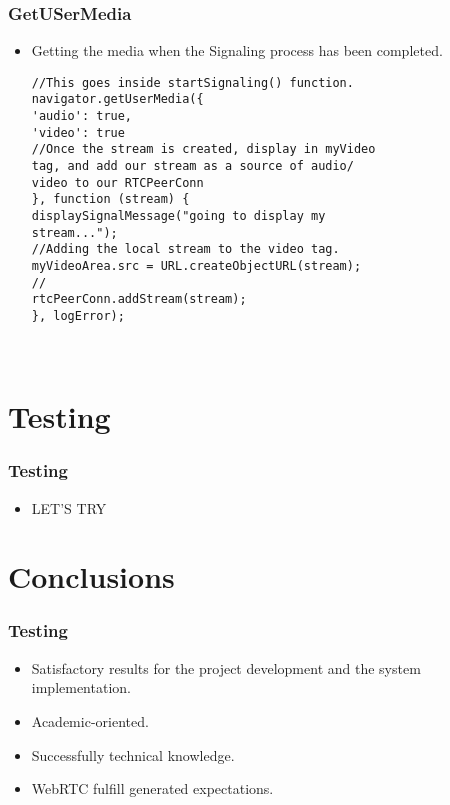 \begin{frame}[fragile]\frametitle{GetUSerMedia}
\begin{itemize}
 \item Getting the media when the Signaling process has been completed.
 
 \begin{lstlisting}[style = JavaScript]
//This goes inside startSignaling() function.
navigator.getUserMedia({
'audio': true,
'video': true
//Once the stream is created, display in myVideo
tag, and add our stream as a source of audio/
video to our RTCPeerConn
}, function (stream) {
displaySignalMessage("going to display my
stream...");
//Adding the local stream to the video tag.
myVideoArea.src = URL.createObjectURL(stream);
//
rtcPeerConn.addStream(stream);
}, logError);

  
 \end{lstlisting}

\end{itemize}
\end{frame}

\section{Testing}

\begin{frame}[fragile]\frametitle{Testing}
\begin{itemize}
\item LET'S TRY
\end{itemize}
\end{frame}


\section{Conclusions}
\begin{frame}[fragile]\frametitle{Testing}
\begin{itemize}
\item Satisfactory results for the project development and the system implementation.
\item Academic-oriented.
\item Successfully technical knowledge.
\item WebRTC fulfill generated expectations.
\end{itemize}
\end{frame}


